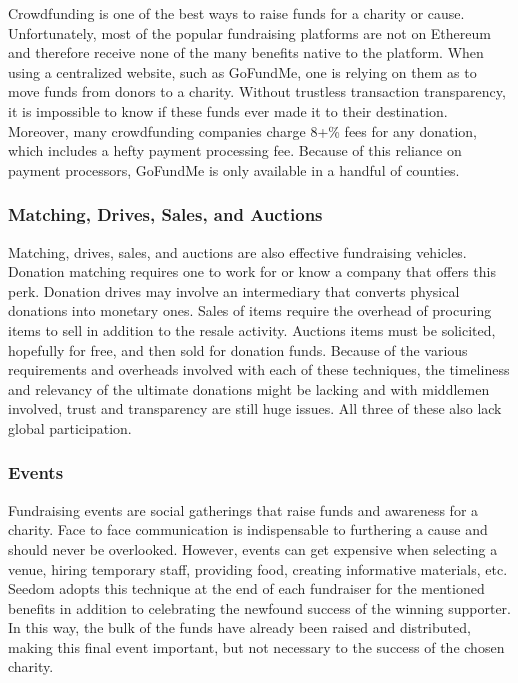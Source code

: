 \documentclass[11pt]{article}
\begin{document}
Crowdfunding is one of the best ways to raise funds for a charity or cause. Unfortunately, most of the popular fundraising platforms are not on Ethereum and therefore receive none of the many benefits native to the platform. When using a centralized website, such as GoFundMe, one is relying on them as to move funds from donors to a charity. Without trustless transaction transparency, it is impossible to know if these funds ever made it to their destination. Moreover, many crowdfunding companies charge 8+\% fees for any donation, which includes a hefty payment processing fee. Because of this reliance on payment processors, GoFundMe is only available in a handful of counties.

\subsubsection{Matching, Drives, Sales, and Auctions}

Matching, drives, sales, and auctions are also effective fundraising vehicles. Donation matching requires one to work for or know a company that offers this perk. Donation drives may involve an intermediary that converts physical donations into monetary ones. Sales of items require the overhead of procuring items to sell in addition to the resale activity. Auctions items must be solicited, hopefully for free, and then sold for donation funds. Because of the various requirements and overheads involved with each of these techniques, the timeliness and relevancy of the ultimate donations might be lacking and with middlemen involved, trust and transparency are still huge issues. All three of these also lack global participation.

\subsubsection{Events}

Fundraising events are social gatherings that raise funds and awareness for a charity. Face to face communication is indispensable to furthering a cause and should never be overlooked. However, events can get expensive when selecting a venue, hiring temporary staff, providing food, creating informative materials, etc. Seedom adopts this technique at the end of each fundraiser for the mentioned benefits in addition to celebrating the newfound success of the winning supporter. In this way, the bulk of the funds have already been raised and distributed, making this final event important, but not necessary to the success of the chosen charity.
\end{document}
